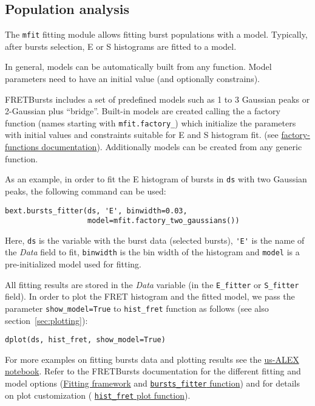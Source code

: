 \subsection{Population analysis}
\label{sec:fretfit}

The \verb|mfit| fitting module allows fitting burst populations with a model.
Typically, after bursts selection, E or S histograms are fitted to a model.

In general, models can be automatically built from any function.
Model parameters need to have an initial value (and optionally
constrains). 

FRETBursts includes a set of predefined models such as 1 to 3 Gaussian
peaks or 2-Gaussian plus ``bridge''.
Built-in models are created calling the a factory function 
(names starting with \verb|mfit.factory_|) which initialize the parameters
with initial values and constraints suitable for E and S histogram fit.
(see
\href{http://fretbursts.readthedocs.org/en/latest/mfit.html#model-factory-functions}{factory-functions documentation}).
Additionally models can be created from any generic function.

As an example, in order to fit the E histogram of bursts in \verb|ds| with two
Gaussian peaks, the following command can be used:

\begin{lstlisting}
bext.bursts_fitter(ds, 'E', binwidth=0.03,
                   model=mfit.factory_two_gaussians())
\end{lstlisting}

Here, \verb|ds| is the variable with the burst data (selected bursts),
\verb|'E'| is the name of the \textit{Data} field to fit, \verb|binwidth| is the bin
width of the histogram and \verb|model| is a pre-initialized model used for
fitting.

All fitting results are stored in the \textit{Data} variable (in the \verb|E_fitter| or
\verb|S_fitter| field).
In order to plot the FRET histogram and the fitted model, we pass the parameter
\verb|show_model=True| to \verb|hist_fret| function as follows
(see also section~\ref{sec:plotting}):

\begin{lstlisting}
dplot(ds, hist_fret, show_model=True)
\end{lstlisting}

For more examples on fitting bursts data and plotting results see the
\href{http://nbviewer.ipython.org/urls/raw.github.com/tritemio/FRETBursts_notebooks/master/notebooks/FRETBursts\%2520-\%2520us-ALEX\%2520smFRET\%2520burst\%2520analysis.ipynb}{us-ALEX notebook}.
Refer to the FRETBursts documentation for the different fitting and model options
(\href{http://fretbursts.readthedocs.org/en/latest/fit.html}{Fitting framework} and
\href{http://fretbursts.readthedocs.org/en/latest/plugins.html#fretbursts.burstlib\_ext.bursts\_fitter}{\texttt{bursts\_fitter} function})
and for details on plot customization (
\href{http://fretbursts.readthedocs.org/en/latest/plots.html#fretbursts.burst_plot.hist_fret}{\texttt{hist\_fret} plot function}).

